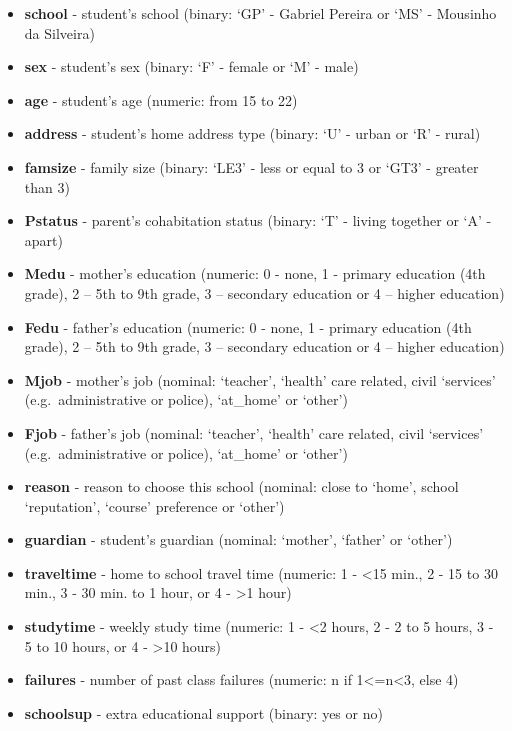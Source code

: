 \documentclass[
]{article}
\providecommand{\tightlist}{%
  \setlength{\itemsep}{0pt}\setlength{\parskip}{0pt}}
\begin{document}
\begin{itemize}
\tightlist
\item
  \textbf{school} - student's school (binary: `GP' - Gabriel Pereira or
  `MS' - Mousinho da Silveira)
\item
  \textbf{sex} - student's sex (binary: `F' - female or `M' - male)
\item
  \textbf{age} - student's age (numeric: from 15 to 22)
\item
  \textbf{address} - student's home address type (binary: `U' - urban or
  `R' - rural)
\item
  \textbf{famsize} - family size (binary: `LE3' - less or equal to 3 or
  `GT3' - greater than 3)
\item
  \textbf{Pstatus} - parent's cohabitation status (binary: `T' - living
  together or `A' - apart)
\item
  \textbf{Medu} - mother's education (numeric: 0 - none, 1 - primary
  education (4th grade), 2 -- 5th to 9th grade, 3 -- secondary education
  or 4 -- higher education)
\item
  \textbf{Fedu} - father's education (numeric: 0 - none, 1 - primary
  education (4th grade), 2 -- 5th to 9th grade, 3 -- secondary education
  or 4 -- higher education)
\item
  \textbf{Mjob} - mother's job (nominal: `teacher', `health' care
  related, civil `services' (e.g.~administrative or police), `at\_home'
  or `other')
\item
  \textbf{Fjob} - father's job (nominal: `teacher', `health' care
  related, civil `services' (e.g.~administrative or police), `at\_home'
  or `other')
\item
  \textbf{reason} - reason to choose this school (nominal: close to
  `home', school `reputation', `course' preference or `other')
\item
  \textbf{guardian} - student's guardian (nominal: `mother', `father' or
  `other')
\item
  \textbf{traveltime} - home to school travel time (numeric: 1 -
  \textless15 min., 2 - 15 to 30 min., 3 - 30 min. to 1 hour, or 4 -
  \textgreater1 hour)
\item
  \textbf{studytime} - weekly study time (numeric: 1 - \textless2 hours,
  2 - 2 to 5 hours, 3 - 5 to 10 hours, or 4 - \textgreater10 hours)
\item
  \textbf{failures} - number of past class failures (numeric: n if
  1\textless=n\textless3, else 4)
\item
  \textbf{schoolsup} - extra educational support (binary: yes or no)

\end{itemize}
\end{document}
